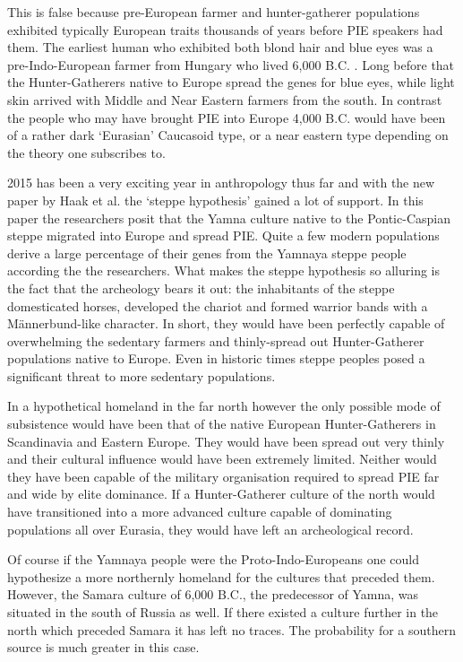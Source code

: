 \begin{footnotesize}
\begin{sffamily}
This is false because pre-European farmer and hunter-gatherer populations exhibited typically European traits thousands of years before PIE speakers had them. The earliest human who exhibited both blond hair and blue eyes was a pre-Indo-European farmer from Hungary who lived 6,000 B.C. . Long before that the Hunter-Gatherers native to Europe spread the genes for blue eyes, while light skin arrived with Middle and Near Eastern farmers from the south. In contrast the people who may have brought PIE into Europe 4,000 B.C. would have been of a rather dark `Eurasian' Caucasoid type, or a near eastern type depending on the theory one subscribes to.

2015 has been a very exciting year in anthropology thus far and with the new paper by Haak et al. the `steppe hypothesis' gained a lot of support. In this paper the researchers posit that the Yamna culture native to the Pontic-Caspian steppe migrated into Europe and spread PIE. Quite a few modern populations derive a large percentage of their genes from the Yamnaya steppe people according the the researchers. What makes the steppe hypothesis so alluring is the fact that the archeology bears it out: the inhabitants of the steppe domesticated horses, developed the chariot and formed warrior bands with a Männerbund-like character. In short, they would have been perfectly capable of overwhelming the sedentary farmers and thinly-spread out Hunter-Gatherer populations native to Europe. Even in historic times steppe peoples posed a significant threat to more sedentary populations.

In a hypothetical homeland in the far north however the only possible mode of subsistence would have been that of the native European Hunter-Gatherers in Scandinavia and Eastern Europe. They would have been spread out very thinly and their cultural influence would have been extremely limited. Neither would they have been capable of the military organisation required to spread PIE far and wide by elite dominance. If a Hunter-Gatherer culture of the north would have transitioned into a more advanced culture capable of dominating populations all over Eurasia, they would have left an archeological record.

Of course if the Yamnaya people were the Proto-Indo-Europeans one could hypothesize a more northernly homeland for the cultures that preceded them. However, the Samara culture of 6,000 B.C., the predecessor of Yamna, was situated in the south of Russia as well. If there existed a culture further in the north which preceded Samara it has left no traces. The probability for a southern source is much greater in this case.


\end{sffamily}
\end{footnotesize}
